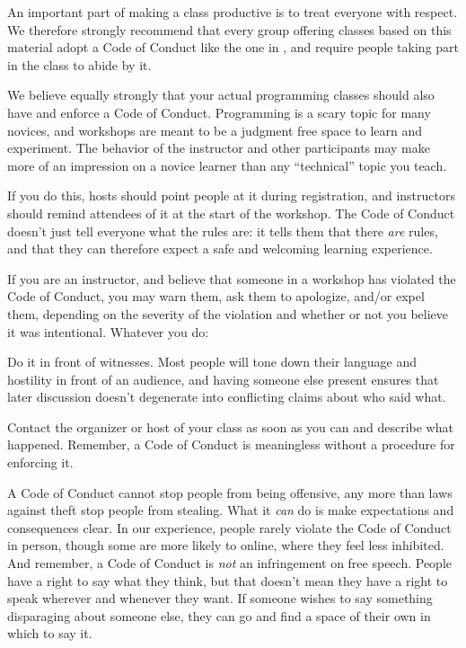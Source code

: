 


An important part of making a class productive is to treat everyone
with respect.  We therefore strongly recommend that every group
offering classes based on this material adopt a Code of Conduct like
the one in , and require people taking part in the
class to abide by it.

We believe equally strongly that your actual programming classes
should also have and enforce a Code of Conduct.  Programming is a
scary topic for many novices, and workshops are meant to be a judgment
free space to learn and experiment. The behavior of the instructor and
other participants may make more of an impression on a novice learner
than any ``technical'' topic you teach.

If you do this, hosts should point people at it during registration,
and instructors should remind attendees of it at the start of the
workshop. The Code of Conduct doesn't just tell everyone what the
rules are: it tells them that there \emph{are} rules, and that they
can therefore expect a safe and welcoming learning experience.

If you are an instructor, and believe that someone in a workshop has
violated the Code of Conduct, you may warn them, ask them to
apologize, and/or expel them, depending on the severity of the
violation and whether or not you believe it was intentional.  Whatever
you do:

\begin{gitemize}

\item
  Do it in front of witnesses.  Most people will tone down their
  language and hostility in front of an audience, and having someone
  else present ensures that later discussion doesn't degenerate into
  conflicting claims about who said what.

\item
  Contact the organizer or host of your class as soon as you can and
  describe what happened.  Remember, a Code of Conduct is meaningless
  without a procedure for enforcing it.

\end{gitemize}

A Code of Conduct cannot stop people from being offensive, any more
than laws against theft stop people from stealing. What it \emph{can}
do is make expectations and consequences clear.  In our experience,
people rarely violate the Code of Conduct in person, though some are
more likely to online, where they feel less inhibited.  And remember,
a Code of Conduct is \emph{not} an infringement on free speech.
People have a right to say what they think, but that doesn't mean they
have a right to speak wherever and whenever they want.  If someone
wishes to say something disparaging about someone else, they can go
and find a space of their own in which to say it.

